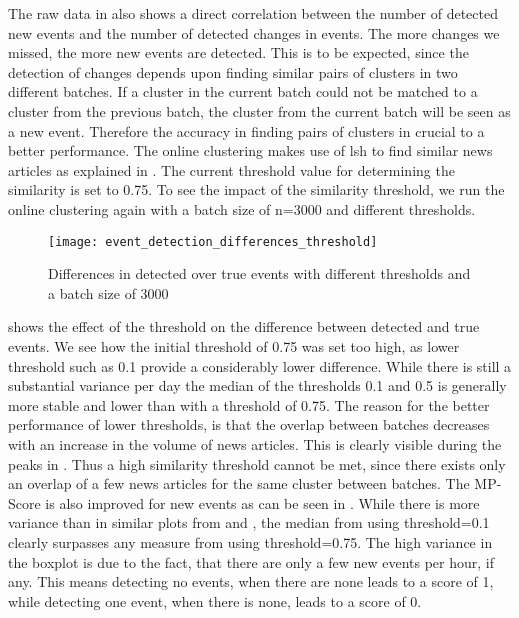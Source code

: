 The raw data in 
also shows a direct correlation between the number of detected new events and the number of detected changes in events.
The more changes we missed, the more new events are detected.
This is to be expected,
since the detection of changes depends upon finding similar pairs of clusters in two different batches.
If a cluster in the current batch could not be matched to a cluster from the previous batch,
the cluster from the current batch will be seen as a new event.
Therefore the accuracy in finding pairs of clusters in crucial to a better performance.
The online clustering makes use of \gls{lsh} to find similar news articles
as explained in .
The current threshold value for determining the similarity is set to 0.75.
To see the impact of the similarity threshold,
we run the online clustering again with a batch size of n=3000 and different thresholds.

\begin{figure}[h]
    \centering
    \texttt{[image: event\_detection\_differences\_threshold]}
    \caption{Differences in detected over true events with different thresholds and a batch size of 3000}
    \label{fig:event_detection_differences_threshold}
\end{figure}

shows the effect of the threshold on the difference between detected and true events.
We see how the initial threshold of 0.75 was set too high,
as lower threshold such as 0.1 provide a considerably lower difference.
While there is still a substantial variance per day the median of the thresholds 0.1 and 0.5
is generally more stable and lower than with a threshold of 0.75.
The reason for the better performance of lower thresholds,
is that the overlap between batches decreases with an increase in the volume of news articles.
This is clearly visible during the peaks in .
Thus a high similarity threshold cannot be met,
since there exists only an overlap of a few news articles for the same cluster between batches.
The MP-Score is also improved for new events as can be seen in .
While there is more variance than in similar plots from 
and ,
the median from using threshold=0.1 clearly surpasses any measure from using threshold=0.75.
The high variance in the boxplot is due to the fact, that there are only a few new events per hour, if any.
This means detecting no events, when there are none leads to a score of 1,
while detecting one event, when there is none, leads to a score of 0.

